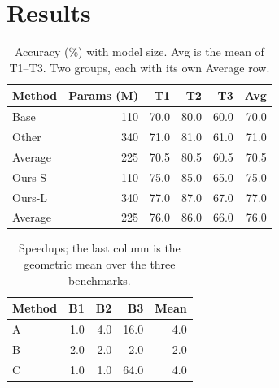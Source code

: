 \documentclass{article}
\begin{document}
\section{Results}
\begin{table}[h]\centering\caption{Accuracy (\%) with model size. Avg is the mean of T1--T3. Two groups, each with its own Average row.}
\begin{tabular}{lrrrrr}
\toprule
Method & Params (M) & T1 & T2 & T3 & Avg \\
\midrule
Base & 110 & 70.0 & 80.0 & 60.0 & 70.0 \\
Other & 340 & 71.0 & 81.0 & 61.0 & 71.0 \\
Average & 225 & 70.5 & 80.5 & 60.5 & 70.5 \\
\midrule
Ours-S & 110 & 75.0 & 85.0 & 65.0 & 75.0 \\
Ours-L & 340 & 77.0 & 87.0 & 67.0 & 77.0 \\
Average & 225 & 76.0 & 86.0 & 66.0 & 76.0 \\
\bottomrule
\end{tabular}\end{table}
\begin{table}[h]\centering\caption{Speedups; the last column is the geometric mean over the three benchmarks.}
\begin{tabular}{lrrrr}
\toprule
Method & B1 & B2 & B3 & Mean \\
\midrule
A & 1.0 & 4.0 & 16.0 & 4.0 \\
B & 2.0 & 2.0 & 2.0 & 2.0 \\
C & 1.0 & 1.0 & 64.0 & 4.0 \\
\bottomrule
\end{tabular}\end{table}
\end{document}
